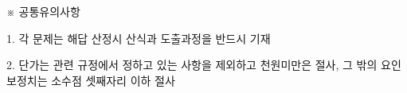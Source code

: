 ※ 공통유의사항 \par
1. 각 문제는 해답 산정시 산식과 도출과정을 반드시 기재 \par
2. 단가는 관련 규정에서 정하고 있는 사항을 제외하고 천원미만은 절사, 그 밖의 요인 보정치는 소수점 셋째자리 이하 절사 \par
